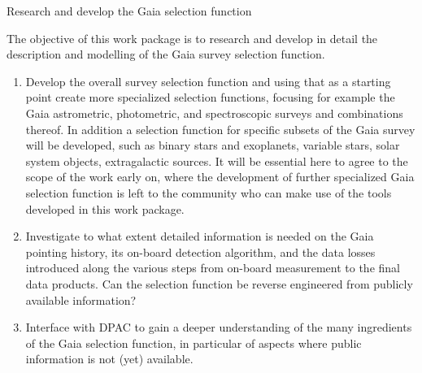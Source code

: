 \begin{workpackage}{Research and develop the Gaia selection function}
  \label{wp:selfungaia}
  \wpend{\duration} %
  
  \makewptable %

  \begin{wpobjectives}
    The objective of this work package is to research and develop in detail the description and modelling of the Gaia survey selection function.
    \begin{enumerate}
      \item Develop the overall survey selection function and using that as a starting point create more specialized selection functions, focusing for example the Gaia astrometric, photometric, and spectroscopic surveys and combinations thereof. In addition a selection function for specific subsets of the Gaia survey will be developed, such as binary stars and exoplanets, variable stars, solar system objects, extragalactic sources. It will be essential here to agree to the scope of the work early on, where the development of further specialized Gaia selection function is left to the community who can make use of the tools developed in this work package. 
      \item Investigate to what extent detailed information is needed on the Gaia pointing history, its on-board detection algorithm, and the data losses introduced along the various steps from on-board measurement to the final data products. Can the selection function be reverse engineered from publicly available information?
      \item Interface with DPAC to gain a deeper understanding of the many ingredients of the Gaia selection function, in particular of aspects where public information is not (yet) available. 
    \end{enumerate}
  \end{wpobjectives}

  \begin{wpdescription}


\end{wpdescription}
\end{workpackage}
